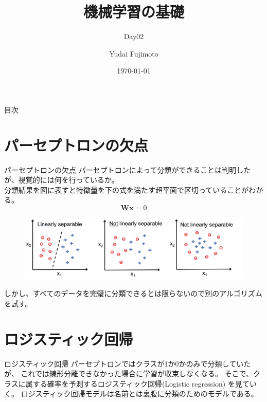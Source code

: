 \documentclass[aspectratio=169, dvipdfmx, 11pt]{beamer} %
\title[Day02]{機械学習の基礎}
\subtitle{Day02}
\author[Yudai Fujimoto]{Yudai Fujimoto}
\institute[SUS]{Suwa University of Science}
\date{\today}
\begin{document}
\maketitle

\begin{frame}{目次}
    \tableofcontents
\end{frame}

\section{パーセプトロンの欠点}
\begin{frame}{パーセプトロンの欠点}
    パーセプトロンによって分類ができることは判明したが、視覚的には何を行っているか。 \\
    分類結果を図に表すと特徴量を下の式を満たす超平面で区切っていることがわかる。 \\
    \begin{equation*}
        \bm{W} \bm{x} = 0
    \end{equation*}
    \begin{figure}[b]
        \begin{center}
        \includegraphics[width=120mm]{img/day02/fig01.png}
        \end{center}
    \end{figure}
    しかし、すべてのデータを完璧に分類できるとは限らないので別のアルゴリズムを試す。
\end{frame}

\section{ロジスティック回帰}
\begin{frame}{ロジスティック回帰}
    パーセプトロンではクラスが1か0かのみで分類していたが、
    これでは線形分離できなかった場合に学習が収束しなくなる。
    そこで、クラスに属する確率を予測するロジスティック回帰(Logistic regression)
    を見ていく。
    ロジスティック回帰モデルは名前とは裏腹に分類のためのモデルである。
\end{frame} 
\end{document}
